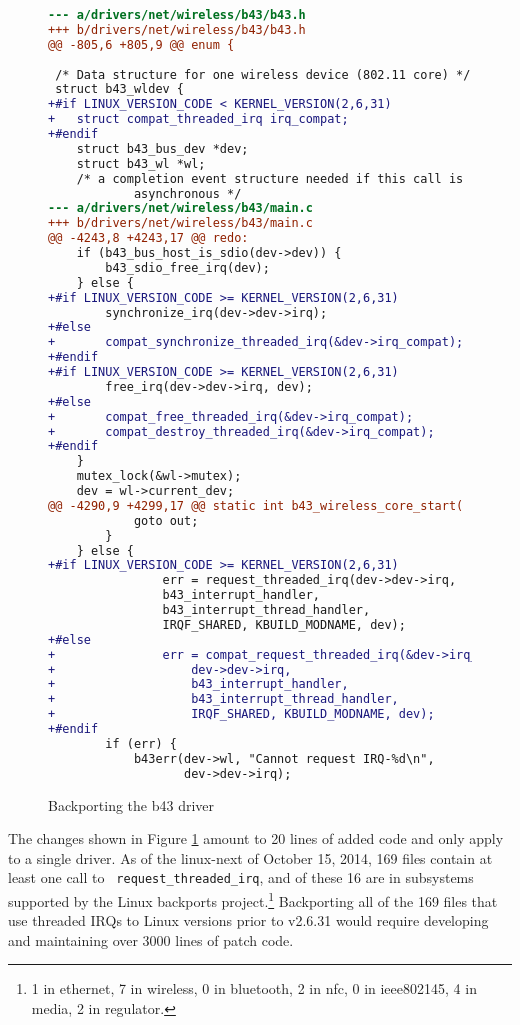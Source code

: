 \begin{figure}
\begin{lstlisting}[language=diff]
--- a/drivers/net/wireless/b43/b43.h
+++ b/drivers/net/wireless/b43/b43.h
@@ -805,6 +805,9 @@ enum {
 
 /* Data structure for one wireless device (802.11 core) */
 struct b43_wldev {
+#if LINUX_VERSION_CODE < KERNEL_VERSION(2,6,31)
+	struct compat_threaded_irq irq_compat;
+#endif
 	struct b43_bus_dev *dev;
 	struct b43_wl *wl;
 	/* a completion event structure needed if this call is
            asynchronous */
--- a/drivers/net/wireless/b43/main.c
+++ b/drivers/net/wireless/b43/main.c
@@ -4243,8 +4243,17 @@ redo:
 	if (b43_bus_host_is_sdio(dev->dev)) {
 		b43_sdio_free_irq(dev);
 	} else {
+#if LINUX_VERSION_CODE >= KERNEL_VERSION(2,6,31)
 		synchronize_irq(dev->dev->irq);
+#else
+		compat_synchronize_threaded_irq(&dev->irq_compat);
+#endif
+#if LINUX_VERSION_CODE >= KERNEL_VERSION(2,6,31)
 		free_irq(dev->dev->irq, dev);
+#else
+		compat_free_threaded_irq(&dev->irq_compat);
+		compat_destroy_threaded_irq(&dev->irq_compat);
+#endif
 	}
 	mutex_lock(&wl->mutex);
 	dev = wl->current_dev;
@@ -4290,9 +4299,17 @@ static int b43_wireless_core_start(
 			goto out;
 		}
 	} else {
+#if LINUX_VERSION_CODE >= KERNEL_VERSION(2,6,31)
                err = request_threaded_irq(dev->dev->irq,
				b43_interrupt_handler,
				b43_interrupt_thread_handler,
				IRQF_SHARED, KBUILD_MODNAME, dev);
+#else
+               err = compat_request_threaded_irq(&dev->irq_compat,
+					dev->dev->irq,
+					b43_interrupt_handler,
+					b43_interrupt_thread_handler,
+					IRQF_SHARED, KBUILD_MODNAME, dev);
+#endif
 		if (err) {
 			b43err(dev->wl, "Cannot request IRQ-%d\n",
 			       dev->dev->irq);
\end{lstlisting}
\caption{Backporting the b43 driver}
\label{compatpatch}
\end{figure}

The changes shown in Figure \ref{compatpatch} amount to 20 lines of added
code and only apply to a single driver.  As of the linux-next of October
15, 2014, 169 files contain at least one call to {\tt
  request\_\-threa\-ded\_\-irq}, and of these 16 are in subsystems supported
by the Linux backports project.\footnote{1 in ethernet, 7 in wireless, 0 in
  bluetooth, 2 in nfc, 0 in ieee802145, 4 in media, 2 in regulator.}
Backporting all of the 169 files that use threaded IRQs to Linux versions
prior to v2.6.31 would require developing and maintaining over 3000 lines
of patch code.

